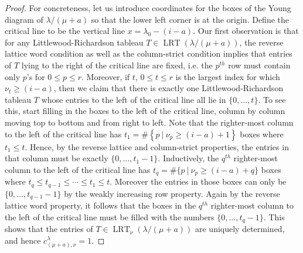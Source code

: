 \documentclass[10pt,a4paper]{amsart}
\begin{document}
\begin{proof}
	For concreteness, let us introduce coordinates for the boxes of the Young diagram of $\lambda/(\mu+a)$ so that the lower left corner is at the origin.  Define the critical line to be the vertical line $x=\lambda_0-(i-a)$.  Our first observation is that for any Littlewood-Richardson tableau $T\in\operatorname{LRT}(\lambda/(\mu+a))$, the reverse lattice word condition as well as the column-strict condition implies that entries of $T$ lying to the right of the critical line are fixed, i.e. the $p^{th}$ row must contain only $p$'s for $0\leq p\leq r$.  Moreover, if $t$, $0\leq t\leq r$ is the largest index for which $\nu_t\geq (i-a)$, then we claim that there is exactly one Littlewood-Richardson tableau $T$ whose entries to the left of the critical line all lie in $\{0,\ldots,t\}$.  To see this, start filling in the boxes to the left of the critical line, column by column moving top to bottom and from right to left.  Note that the righter-most column to the left of the critical line has $t_1=\#\left\{p \ | \ \nu_p\geq (i-a)+1\right\}$ boxes where $t_1\leq t$.  Hence, by the reverse lattice and column-strict properties, the entries in that column must be exactly $\{0,\ldots,t_1-1\}$.  Inductively, the $q^{th}$ righter-most column to the left of the critical line has $t_q=\#\{p \ | \ \nu_p\geq (i-a)+q\}$ boxes where $t_q\leq t_{q-1}\leq \cdots\leq t_1\leq t$.  Moreover the entries in those boxes can only be $\{0,\ldots,t_{q-1}-1\}$ by the weakly increasing row property.  Again by the reverse lattice word property, it follows that the boxes in the $q^{th}$ righter-most column to the left of the critical line must be filled with the numbers $\{0,\ldots,t_q-1\}$.  This shows that the entries of $T\in\operatorname{LRT}_\nu(\lambda/(\mu+a))$ are uniquely determined, and hence $c^\lambda_{(\mu+a),\nu}=1$.
	

\end{proof}
\end{document}
